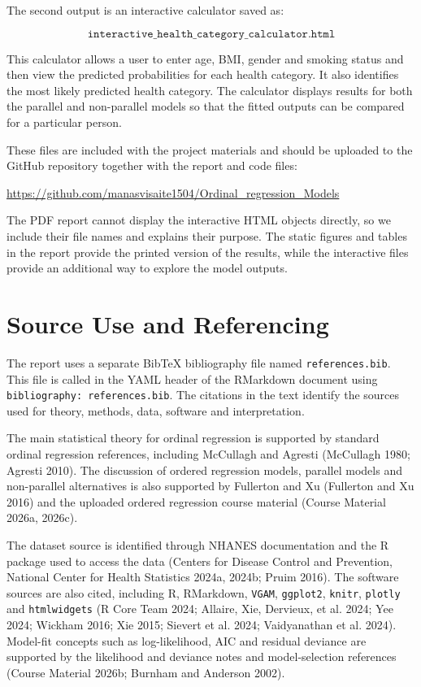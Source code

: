 \documentclass{article}
\begin{document}
The second output is an interactive calculator saved as:

\[
\texttt{interactive\_health\_category\_calculator.html}
\]

This calculator allows a user to enter age, BMI, gender and smoking
status and then view the predicted probabilities for each health
category. It also identifies the most likely predicted health category.
The calculator displays results for both the parallel and non-parallel
models so that the fitted outputs can be compared for a particular
person.

These files are included with the project materials and should be
uploaded to the GitHub repository together with the report and code
files:

\url{https://github.com/manasvisaite1504/Ordinal_regression_Models}

The PDF report cannot display the interactive HTML objects directly, so
we include their file names and explains their purpose. The static
figures and tables in the report provide the printed version of the
results, while the interactive files provide an additional way to
explore the model outputs.

\section{Source Use and Referencing}\label{source-use-and-referencing}

The report uses a separate BibTeX bibliography file named
\texttt{references.bib}. This file is called in the YAML header of the
RMarkdown document using \texttt{bibliography:\ references.bib}. The
citations in the text identify the sources used for theory, methods,
data, software and interpretation.

The main statistical theory for ordinal regression is supported by
standard ordinal regression references, including McCullagh and Agresti
(McCullagh 1980; Agresti 2010). The discussion of ordered regression
models, parallel models and non-parallel alternatives is also supported
by Fullerton and Xu (Fullerton and Xu 2016) and the uploaded ordered
regression course material (Course Material 2026a, 2026c).

The dataset source is identified through NHANES documentation and the R
package used to access the data (Centers for Disease Control and
Prevention, National Center for Health Statistics 2024a, 2024b; Pruim
2016). The software sources are also cited, including R, RMarkdown,
\texttt{VGAM}, \texttt{ggplot2}, \texttt{knitr}, \texttt{plotly} and
\texttt{htmlwidgets} (R Core Team 2024; Allaire, Xie, Dervieux, et al.
2024; Yee 2024; Wickham 2016; Xie 2015; {Sievert et al.} 2024;
Vaidyanathan et al. 2024). Model-fit concepts such as log-likelihood,
AIC and residual deviance are supported by the likelihood and deviance
notes and model-selection references (Course Material 2026b; Burnham and
Anderson 2002).
\end{document}
